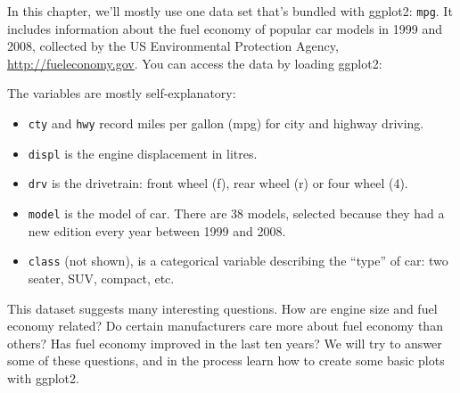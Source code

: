 In this chapter, we'll mostly use one data set that's bundled with
ggplot2: \texttt{mpg}. It includes information about the fuel economy of
popular car models in 1999 and 2008, collected by the US Environmental
Protection Agency, \url{http://fueleconomy.gov}. You can access the data
by loading ggplot2: 

\begin{Shaded}
\begin{Highlighting}[]
\CommentTok{#> }
\end{Highlighting}
\end{Shaded}

The variables are mostly self-explanatory:

\begin{itemize}
\item
  \texttt{cty} and \texttt{hwy} record miles per gallon (mpg) for city
  and highway driving.
\item
  \texttt{displ} is the engine displacement in litres.
\item
  \texttt{drv} is the drivetrain: front wheel (f), rear wheel (r) or
  four wheel (4).
\item
  \texttt{model} is the model of car. There are 38 models, selected
  because they had a new edition every year between 1999 and 2008.
\item
  \texttt{class} (not shown), is a categorical variable describing the
  ``type'' of car: two seater, SUV, compact, etc.
\end{itemize}

This dataset suggests many interesting questions. How are engine size
and fuel economy related? Do certain manufacturers care more about fuel
economy than others? Has fuel economy improved in the last ten years? We
will try to answer some of these questions, and in the process learn how
to create some basic plots with ggplot2.


